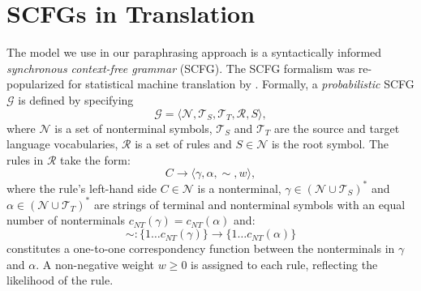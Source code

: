 \documentclass[11pt]{article}
\newcommand{\mnote}[1]{\marginpar{%
  \vskip-\baselineskip
  \raggedright\footnotesize
  \itshape\hrule\smallskip\footnotesize{#1}\par\smallskip\hrule}}
\begin{document}


\section{SCFGs in Translation} \label{formalism}

The model we use in our paraphrasing approach is a syntactically
informed \emph{ synchronous context-free grammar} (SCFG).  The SCFG
formalism \cite{Aho1972} was re-popularized for statistical machine
translation by .  Formally, a \emph{probabilistic}
SCFG $\mathcal{G}$ is defined by specifying
\[
\mathcal{G} = \langle \mathcal{N}, \mathcal{T}_S, \mathcal{T}_T,
\mathcal{R}, S \rangle ,
\]
where $\mathcal{N}$ is a set of nonterminal symbols, $\mathcal{T}_S$
and $\mathcal{T}_T$ are the source and target language vocabularies,
$\mathcal{R}$ is a set of rules and $S \in \mathcal{N}$ is the root
symbol. The rules in $\mathcal{R}$ take the form:
\begin{equation*}
  C \rightarrow \langle \gamma, \alpha, \sim, w \rangle ,
\end{equation*}
where the rule's left-hand side $C \in \mathcal{N}$ is a nonterminal,
$\gamma \in (\mathcal{N} \cup \mathcal{T}_S)^*$ and $\alpha \in
(\mathcal{N} \cup \mathcal{T}_T)^*$ are strings of terminal and
nonterminal symbols with an equal number of nonterminals
$c_{\mathit{NT}}(\gamma) = c_{\mathit{NT}}(\alpha)$ and:
$$
\sim : \{1 \ldots c_{\mathit{NT}}(\gamma)\} \rightarrow \{1 \ldots
c_{\mathit{NT}}(\alpha)\}
$$ 
constitutes a one-to-one correspondency function between the
nonterminals in $\gamma$ and $\alpha$. A non-negative weight $w \geq
0$ is assigned to each rule, reflecting the likelihood of the rule.
\end{document}
